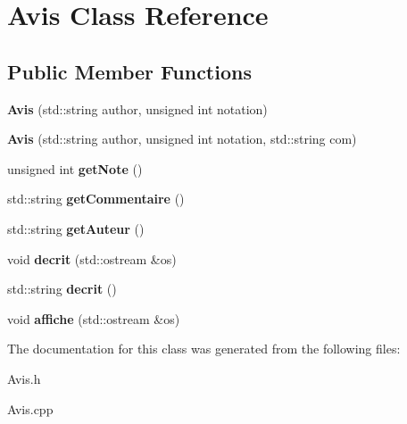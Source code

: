 \section{Avis Class Reference}
\label{class_avis}
\subsection*{Public Member Functions}
\begin{DoxyCompactItemize}
\item 
{\bfseries Avis} (std\-::string author, unsigned int notation)\label{class_avis_a93b6b6e8ce6e399a9dc017284063a841}

\item 
{\bfseries Avis} (std\-::string author, unsigned int notation, std\-::string com)\label{class_avis_ada1766d4665eded0f8d582b366f56bfe}

\item 
unsigned int {\bfseries get\-Note} ()\label{class_avis_a38aac72b52990bbe4f7bcec663c560c6}

\item 
std\-::string {\bfseries get\-Commentaire} ()\label{class_avis_ae03e2b620c88bcc258821b8247529425}

\item 
std\-::string {\bfseries get\-Auteur} ()\label{class_avis_a291d331943b1bcb18ee4290624f5a178}

\item 
void {\bfseries decrit} (std\-::ostream \&os)\label{class_avis_abbab76777e1327d7f88d20fce541c7a5}

\item 
std\-::string {\bfseries decrit} ()\label{class_avis_a517878e3f5196c23cc179f3fe5a1a98d}

\item 
void {\bfseries affiche} (std\-::ostream \&os)\label{class_avis_af94b335023000d4ded81528c90e86c32}

\end{DoxyCompactItemize}


The documentation for this class was generated from the following files\-:\begin{DoxyCompactItemize}
\item 
Avis.\-h\item 
Avis.\-cpp\end{DoxyCompactItemize}
